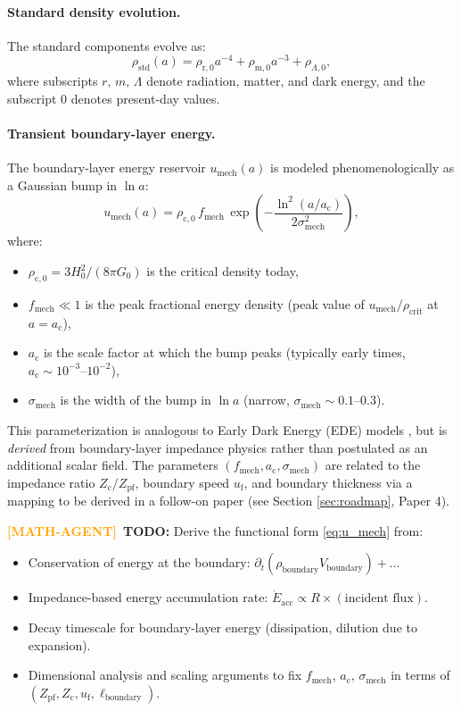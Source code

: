 \documentclass[11pt,a4paper]{article}
\newcommand{\ac}{a_{\mathrm{c}}}
\newcommand{\sigmamech}{\sigma_{\mathrm{mech}}}
\newcommand{\fmech}{f_{\mathrm{mech}}}
\newcommand{\umech}{u_{\mathrm{mech}}}
\newcommand{\rhocrit}{\rho_{\mathrm{crit}}}
\newcommand{\rhostd}{\rho_{\mathrm{std}}}
\newcommand{\Zpf}{Z_{\mathrm{pf}}}
\newcommand{\Zcond}{Z_{\mathrm{c}}}
\newcommand{\uf}{u_{\mathrm{f}}}
\theoremstyle{definition}
\newcommand{\MATHAGENT}{\textcolor{orange}{\textbf{[MATH-AGENT]}}}
\begin{document}
\paragraph{Standard density evolution.}
The standard components evolve as:
\begin{equation}
\label{eq:rho_std}
\rhostd(a) = \rho_{\mathrm{r},0} a^{-4} + \rho_{\mathrm{m},0} a^{-3} + \rho_{\Lambda,0},
\end{equation}
where subscripts $r$, $m$, $\Lambda$ denote radiation, matter, and dark energy, and the subscript $0$ denotes present-day values.

\paragraph{Transient boundary-layer energy.}
The boundary-layer energy reservoir $\umech(a)$ is modeled phenomenologically as a Gaussian bump in $\ln a$:
\begin{equation}
\label{eq:u_mech}
\umech(a) = \rho_{\mathrm{c},0} \, \fmech \, \exp\!\left( -\frac{\ln^2(a/\ac)}{2\sigmamech^2} \right),
\end{equation}
where:
\begin{itemize}[leftmargin=1.8em]
  \item $\rho_{\mathrm{c},0} = 3H_0^2/(8\pi G_0)$ is the critical density today,
  \item $\fmech \ll 1$ is the peak fractional energy density (peak value of $\umech/\rhocrit$ at $a = \ac$),
  \item $\ac$ is the scale factor at which the bump peaks (typically early times, $\ac \sim 10^{-3}$--$10^{-2}$),
  \item $\sigmamech$ is the width of the bump in $\ln a$ (narrow, $\sigmamech \sim 0.1$--$0.3$).
\end{itemize}

This parameterization is analogous to Early Dark Energy (EDE) models \cite{EDEReview2023,PoulinReview2023}, but is \emph{derived} from boundary-layer impedance physics rather than postulated as an additional scalar field. The parameters $(\fmech, \ac, \sigmamech)$ are related to the impedance ratio $\Zcond/\Zpf$, boundary speed $\uf$, and boundary thickness via a mapping to be derived in a follow-on paper (see Section \ref{sec:roadmap}, Paper 4).

\MATHAGENT~\textbf{TODO:} Derive the functional form \eqref{eq:u_mech} from:
\begin{itemize}
  \item Conservation of energy at the boundary: $\partial_t (\rho_{\mathrm{boundary}} V_{\mathrm{boundary}}) + \dots$
  \item Impedance-based energy accumulation rate: $\dot{E}_{\mathrm{acc}} \propto R \times (\text{incident flux})$.
  \item Decay timescale for boundary-layer energy (dissipation, dilution due to expansion).
  \item Dimensional analysis and scaling arguments to fix $\fmech$, $\ac$, $\sigmamech$ in terms of $(\Zpf, \Zcond, \uf, \ell_{\mathrm{boundary}})$.
\end{itemize}
\end{document}
